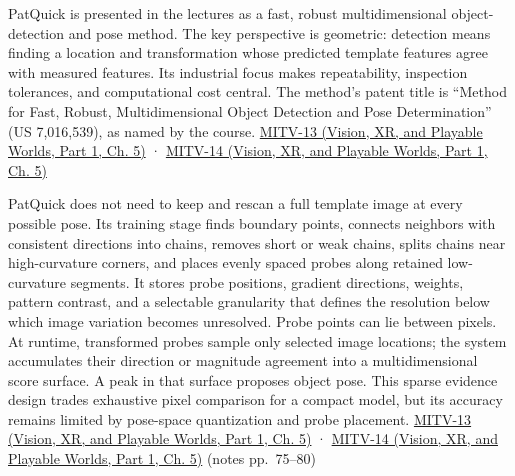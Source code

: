 PatQuick is presented in the lectures as a fast, robust multidimensional object-detection and pose method. The key perspective is geometric: detection means finding a location and transformation whose predicted template features agree with measured features. Its industrial focus makes repeatability, inspection tolerances, and computational cost central. The method's patent title is ``Method for Fast, Robust, Multidimensional Object Detection and Pose Determination'' (US 7,016,539), as named by the course. \href{../07-Vision-XR-and-Playable-Worlds-P01/main.pdf\#nameddest=04-visual-computing-ii-ch036-mitv-13---object-detection-recognition-and-pose-determination-patquick-us-7016539}{MITV-13 (Vision, XR, and Playable Worlds, Part 1, Ch. 5)} · \href{../07-Vision-XR-and-Playable-Worlds-P01/main.pdf\#nameddest=04-visual-computing-ii-ch036-mitv-14---inspection-in-patquick-hough-transform-homography-position-determination-multi-scale}{MITV-14 (Vision, XR, and Playable Worlds, Part 1, Ch. 5)}

PatQuick does not need to keep and rescan a full template image at every possible pose. Its training stage finds boundary points, connects neighbors with consistent directions into chains, removes short or weak chains, splits chains near high-curvature corners, and places evenly spaced probes along retained low-curvature segments. It stores probe positions, gradient directions, weights, pattern contrast, and a selectable granularity that defines the resolution below which image variation becomes unresolved. Probe points can lie between pixels. At runtime, transformed probes sample only selected image locations; the system accumulates their direction or magnitude agreement into a multidimensional score surface. A peak in that surface proposes object pose. This sparse evidence design trades exhaustive pixel comparison for a compact model, but its accuracy remains limited by pose-space quantization and probe placement. \href{../07-Vision-XR-and-Playable-Worlds-P01/main.pdf\#nameddest=04-visual-computing-ii-ch036-mitv-13---object-detection-recognition-and-pose-determination-patquick-us-7016539}{MITV-13 (Vision, XR, and Playable Worlds, Part 1, Ch. 5)} · \href{../07-Vision-XR-and-Playable-Worlds-P01/main.pdf\#nameddest=04-visual-computing-ii-ch036-mitv-14---inspection-in-patquick-hough-transform-homography-position-determination-multi-scale}{MITV-14 (Vision, XR, and Playable Worlds, Part 1, Ch. 5)} (notes pp.~75--80)

